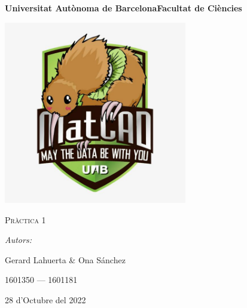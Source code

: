 \documentclass[a4paper, 11pt]{article}
\begin{document}
\begin{titlepage}
    \centering
    {\bfseries\LARGE \hspace{1.9em} Universitat Autònoma de Barcelona\newline Facultat de Ciències\par}
    \vspace{2cm}
    {\hspace{-1em}\includegraphics[width=0.6\textwidth]{MatCAD3.jpg}\par}
    \vspace{1cm}
    {\scshape\Huge Pràctica 1\par} 
    \vspace{1cm}
    {\Large \itshape Autors: \par}
    \vspace{0.5cm}
    {\Large \hspace{-1.5 em}Gerard Lahuerta \& Ona Sánchez \par}
    \vspace{0.5cm}
    {\Large 1601350 --- 1601181 \par}
    \vspace{1cm}
    {\Large 28 d'Octubre del 2022\par}
\end{titlepage}

\justifying

\newpage
{
\small
\setcounter{page}{2}
\pagestyle{plain}
\tableofcontents
\cleardoublepage
{}
}
\newpage
\end{document}
